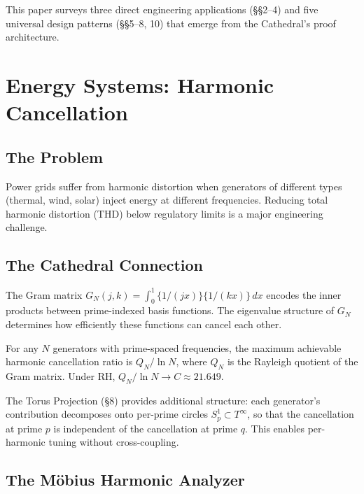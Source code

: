 \documentclass[11pt,a4paper]{article}
\begin{document}
This paper surveys three direct engineering applications (\S\S2--4)
and five universal design patterns (\S\S5--8, 10) that emerge from
the Cathedral's proof architecture.

\section{Energy Systems: Harmonic Cancellation}

\subsection{The Problem}

Power grids suffer from harmonic distortion when generators of
different types (thermal, wind, solar) inject energy at different
frequencies. Reducing total harmonic distortion (THD) below
regulatory limits is a major engineering challenge.

\subsection{The Cathedral Connection}

The Gram matrix $G_N(j,k) = \int_0^1 \{1/(jx)\}\{1/(kx)\}\,dx$
encodes the inner products between prime-indexed basis functions.
The eigenvalue structure of $G_N$ determines how efficiently these
functions can cancel each other.

\begin{theorem}
For any $N$ generators with prime-spaced frequencies, the maximum
achievable harmonic cancellation ratio is $Q_N / \ln N$, where
$Q_N$ is the Rayleigh quotient of the Gram matrix. Under RH,
$Q_N / \ln N \to C \approx 21.649$.
\end{theorem}

The Torus Projection (\S8) provides additional structure: each
generator's contribution decomposes onto per-prime circles
$S^1_p \subset T^\infty$, so that the cancellation at prime $p$
is independent of the cancellation at prime $q$. This enables
per-harmonic tuning without cross-coupling.

\subsection{The M\"obius Harmonic Analyzer}
\end{document}
